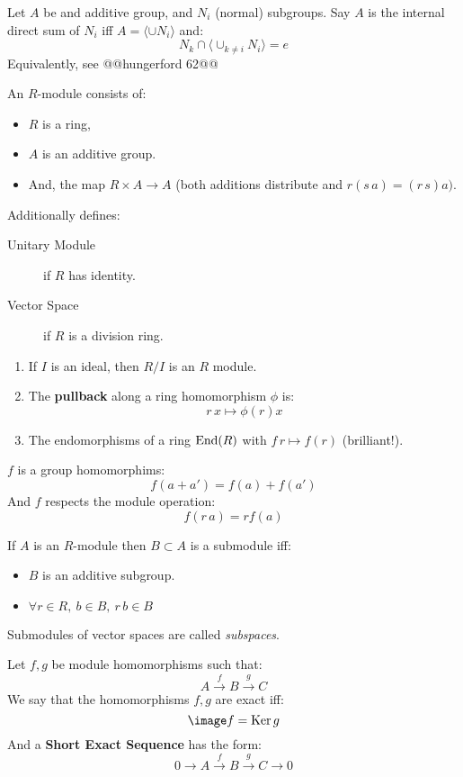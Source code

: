 \begin{ddef}
    Let $A$ be and additive group, and $N_i$ (normal) subgroups. Say $A$ is the internal direct sum of $N_i$ iff $A=\langle \cup N_i\rangle$ and:
    $$N_k \cap\langle \cup_{k\neq i}N_i\rangle=e $$
    Equivalently, see @@hungerford 62@@
\end{ddef}

\begin{ddef}[Modules]
An $R$-module consists of:
\begin{itemize}
\item $R$ is a ring, 
\item $A$ is an additive group.
\item And, the map $R\times A \to A$ (both additions distribute and $r(s\,a)=(r\,s)a)$.
\end{itemize}
Additionally defines:
\begin{description}
    \item[Unitary Module] if $R$ has identity.
    \item[Vector Space] if $R$ is a division ring.
\end{description}
\end{ddef}

\begin{examples}
    \begin{enumerate}
        \item If $I$ is an ideal, then $R/I$ is an $R$ module.
        \item The \textbf{pullback} along a ring homomorphism $\phi$ is:
            $$r\,x \mapsto \phi(r)x$$
        \item The endomorphisms of a ring $\operatorname{End}(R)$ with $f\,r \mapsto f(r)$ (brilliant!). 
    \end{enumerate}
\end{examples}

\begin{ddef}
    $f$ is a group homomorphims:
    $$f(a+a') = f(a)+f(a')$$
    And $f$ respects the module operation:
    $$f(r\,a) = rf(a)$$
\end{ddef}

\begin{ddef}[Submodules]
    If $A$ is an $R$-module then $B\subset A$ is a submodule iff:
    \begin{itemize}
        \item $B$ is an additive subgroup.
        \item $\forall r\in R,\ b\in B,\ r\,b\in B$
    \end{itemize}
    Submodules of vector spaces are called \emph{subspaces}.
\end{ddef}

\begin{ddef}
    Let $f,g$ be module homomorphisms such that:
    $$A\xrightarrow{f} B \xrightarrow{g} C$$
    We say that the homomorphisms $f,g$ are exact iff:
    $$\image f = \ker g$$
    And a \textbf{Short Exact Sequence} has the form:
    $$0\to A\xrightarrow{f} B \xrightarrow{g} C\to 0$$
\end{ddef}
